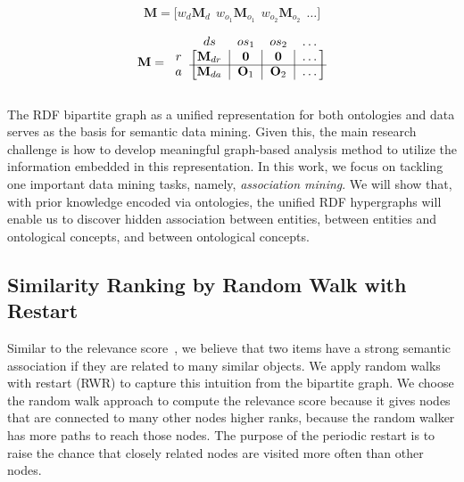 \begin{equation}\label{eq:horzcat}
\mathbf{M} = \bigg[w_d\mathbf{M}_d ~~ w_{o_1}\mathbf{M}_{o_1} ~~ w_{o_2}\mathbf{M}_{o_2} ~~ \dots\bigg]
\end{equation}

\begin{equation}
\label{striped_M}
\mathbf{M}=\begin{blockarray}{ccccc}
                ~ & ds & os_1 & os_2 & \dots \\
            \begin{block}{c[c|c|c|c]}
                r   &   \mathbf{M}_{dr}  &   \mathbf{0}   &   \mathbf{0}   &   \dots \\
                \cline{2-5}
                a   &   \mathbf{M}_{da}  &   \mathbf{O}_1 &   \mathbf{O}_2 &   \dots \\
            \end{block}
        \end{blockarray}
\end{equation}

The RDF bipartite graph as a unified representation for both ontologies and data serves as the basis for semantic data mining. Given this, the main research challenge is how to develop meaningful graph-based analysis method to utilize the information embedded in this representation. In this work, we focus on tackling one important data mining tasks, namely, {\em association mining}. We will show that, with prior knowledge encoded via ontologies, the unified RDF hypergraphs will enable us to discover hidden association between entities, between entities and ontological concepts, and between ontological concepts.

\subsection{Similarity Ranking by Random Walk with Restart}

Similar to the relevance score~\cite{SunEtal05}, we believe that two items have a strong semantic association if they are related to many similar objects. We apply random walks with restart (RWR) to capture this intuition from the bipartite graph.  We choose the random walk approach to compute the relevance score because it gives nodes that are connected to many other nodes higher ranks, because the random walker has more paths to reach those nodes. The purpose of the periodic restart is to raise the chance that closely related nodes are visited more often than other nodes.

